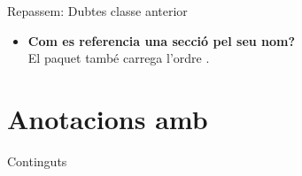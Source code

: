
\date{17 de maig de 2024}

\subtitle{Tercera part}

\newcommand{\mar}[1]{\todo[color=green!40]{#1}}
\newcommand{\andreu}[1]{\todo[color=purple!40]{#1}}



\begin{frame}
\titlepage{}
\end{frame}

\begin{frame}[fragile]{Repassem: Dubtes classe anterior}
\begin{itemize}
    \item \textbf{Com es referencia una secció pel seu nom?}\\
    El paquet  també carrega l'ordre .
\begin{exampletwouptiny}
\end{exampletwouptiny}
\end{itemize}
\end{frame}

\section{Anotacions amb \protect{}}
\begin{frame}{Continguts}
\begin{multicols}{2}
\tableofcontents[currentsection]
\end{multicols}
\end{frame}

